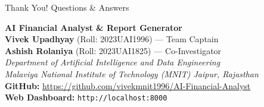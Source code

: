 \documentclass[aspectratio=169,10pt]{beamer}
\begin{document}
\begin{frame}{Thank You! Questions \& Answers}
\begin{center}
\LARGE \textbf{AI Financial Analyst \& Report Generator} \\
\vspace{0.4cm}
\normalsize
\textbf{Vivek Upadhyay} (Roll: 2023UAI1996) --- Team Captain \\
\textbf{Ashish Rolaniya} (Roll: 2023UAI1825) --- Co-Investigator \\
\vspace{0.3cm}
\textit{Department of Artificial Intelligence and Data Engineering} \\
\textit{Malaviya National Institute of Technology (MNIT) Jaipur, Rajasthan} \\
\vspace{0.4cm}
\textbf{GitHub:} \url{https://github.com/vivekmnit1996/AI-Financial-Analyst} \\
\textbf{Web Dashboard:} \texttt{http://localhost:8000}
\end{center}
\end{frame}
\end{document}
